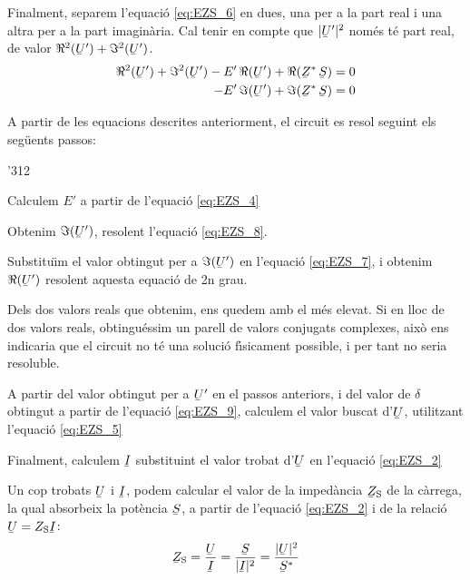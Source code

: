 Finalment, separem l'equaci\'{o} \eqref{eq:EZS_6} en dues, una per a la part real i una altra per a la part imagin\`{a}ria. Cal tenir en compte que $|\cmplx{U}'|^2$ nom\'{e}s t\'{e} part real, de valor $\Re^2(\cmplx{U}') + \Im^2(\cmplx{U}')$.
\begin{align}
   \Re^2(\cmplx{U}') + \Im^2(\cmplx{U}') - E' \, \Re(\cmplx{U}') + \Re(\cmplx{Z}^* \, \cmplx{S}) &= 0 \label{eq:EZS_7} \\
   - E' \, \Im(\cmplx{U}') + \Im(\cmplx{Z}^* \, \cmplx{S}) &= 0 \label{eq:EZS_8}
\end{align}

A partir de les equacions descrites anteriorment, el circuit es resol seguint els seg\"{u}ents passos:
\begin{dingautolist}{'312}
   \item Calculem $E'$ a partir de l'equaci\'{o} \eqref{eq:EZS_4}
   \item Obtenim $\Im(\cmplx{U}')$, resolent l'equaci\'{o} \eqref{eq:EZS_8}.
   \item Substitu\"{\i}m el valor obtingut per a $\Im(\cmplx{U}')$ en l'equaci\'{o} \eqref{eq:EZS_7}, i obtenim $\Re(\cmplx{U}')$ resolent aquesta equaci\'{o} de 2n grau.
   \item Dels dos valors reals que obtenim, ens quedem amb el m\'{e}s elevat. Si en lloc de dos valors reals, obtingu\'{e}ssim un parell de valors conjugats complexes, aix\`{o} ens indicaria que el circuit no t\'{e} una soluci\'{o} f\'{\i}sicament possible, i per tant no seria resoluble.
   \item A partir del valor  obtingut per a $\cmplx{U}'$ en el passos anteriors, i del valor de $\delta$ obtingut a partir de l'equaci\'{o} \eqref{eq:EZS_9}, calculem el valor buscat d'$\cmplx{U}$, utilitzant l'equaci\'{o} \eqref{eq:EZS_5}
   \item Finalment, calculem $\cmplx{I}$ substituint el valor trobat d'$\cmplx{U}$ en l'equaci\'{o} \eqref{eq:EZS_2}
\end{dingautolist}

Un cop trobats $\cmplx{U}$ i $\cmplx{I}$, podem calcular el valor de
la imped\`{a}ncia  $\cmplx{Z}\ped{S}$ de la c\`{a}rrega, la qual absorbeix
la pot\`{e}ncia $\cmplx{S}$, a partir de l'equaci\'{o} \eqref{eq:EZS_2} i de
la relaci\'{o} $\cmplx{U} = Z\ped{S} \cmplx{I}$:
\begin{equation}
   \cmplx{Z}\ped{S} = \frac{\cmplx{U}}{\cmplx{I}} =
   \frac{\cmplx{S}}{|\cmplx{I}|^2} =
   \frac{|\cmplx{U}|^2}{\cmplx{S}^*} \label{eq:EZS 10}
\end{equation}

